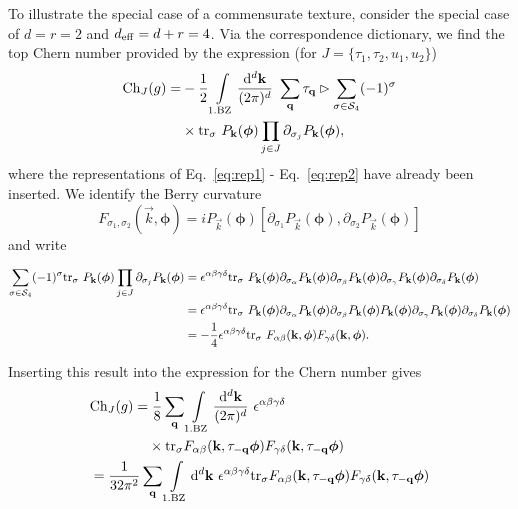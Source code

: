 \documentclass[
    10pt,
    aps,
    prb,
    twocolumn,
    floatfix,
    superscriptaddress,
]{revtex4-2}
\begin{document}
To illustrate the special case of a commensurate texture, consider the special case of $d=r=2$ and ${d_\mathrm{eff}} =d+r=4$.
Via the correspondence dictionary, we find the top Chern number provided by the expression (for $J=\lbrace \tau_1, \tau_2, u_1, u_2 \rbrace $)
\begin{align}
{\rm Ch}_{J}(g)
= & -\frac{1}{2}
\int\limits_{\mathrm{1.BZ}} \frac{\mathrm{d}^d \mathbf{k}}{(2\pi)^d}~\sum_{\mathbf{q}}\tau_{\mathbf{q}} \rhd\sum_{\sigma \in {\mathcal S}_{4}} (-1)^\sigma 
\notag \\ & 
\times \mathrm{tr}_\sigma ~ 
P_{\mathbf{k}}(\boldsymbol{\phi}) \prod_{j \in J} \partial_{\sigma_j}P_{\mathbf{k}}(\boldsymbol{\phi}),
\end{align}
where the representations of Eq.~\ref{eq:rep1} - Eq.~\ref{eq:rep2} have already been inserted.
We identify the Berry curvature 
\begin{equation}
	F_{\sigma_1, \sigma_2}(\vec{k}, \boldsymbol{\phi})
	= i P_{\vec{k}}(\boldsymbol{\phi}) [
	\partial_{\sigma_1} P_{\vec{k}}(\boldsymbol{\phi}), \partial_{\sigma_2} 
	P_{\vec{k}}(\boldsymbol{\phi}) ]
\end{equation}
and write
\begin{widetext}
\begin{align}
\sum_{\sigma \in {\mathcal S}_{4}} (-1)^\sigma \mathrm{tr}_\sigma ~ 
P_{\mathbf{k}}(\boldsymbol{\phi}) \prod_{j \in J} \partial_{\sigma_j}P_{\mathbf{k}}(\boldsymbol{\phi}) &=
\epsilon^{\alpha\beta\gamma\delta}
\mathrm{tr}_\sigma ~
P_{\mathbf{k}}(\boldsymbol{\phi}) \partial_{\sigma_\alpha }P_{\mathbf{k}}(\boldsymbol{\phi})
\partial_{\sigma_\beta }P_{\mathbf{k}}(\boldsymbol{\phi})
\partial_{\sigma_\gamma }P_{\mathbf{k}}(\boldsymbol{\phi})
\partial_{\sigma_\delta }P_{\mathbf{k}}(\boldsymbol{\phi})
\notag \\
&=
\epsilon^{\alpha\beta\gamma\delta}
\mathrm{tr}_\sigma ~
P_{\mathbf{k}}(\boldsymbol{\phi}) \partial_{\sigma_\alpha }P_{\mathbf{k}}(\boldsymbol{\phi})
\partial_{\sigma_\beta }P_{\mathbf{k}}(\boldsymbol{\phi})
P_{\mathbf{k}}(\boldsymbol{\phi}) 
\partial_{\sigma_\gamma }P_{\mathbf{k}}(\boldsymbol{\phi})
\partial_{\sigma_\delta }P_{\mathbf{k}}(\boldsymbol{\phi})
\notag \\
& = - \frac{1}{4}
\epsilon^{\alpha\beta\gamma\delta}
\mathrm{tr}_\sigma ~F_{\alpha \beta}(\mathbf{k}, \boldsymbol{\phi}) F_{\gamma\delta}(\mathbf{k}, \boldsymbol{\phi}) .
\end{align}
\end{widetext}   
\vfill
Inserting this result into the expression for the Chern number gives 
\begin{align}
	&{\rm Ch}_{J}(g) = \frac{1}{8 }\sum_{\vec{q}}
    \int\limits_{\mathrm{1.BZ}} \frac{\dd^d \vec{k}}{(2\pi)^d}~ \epsilon^{\alpha\beta\gamma\delta}
    \notag \\
    & \phantom{{\rm Ch}_{J}(g) = } \times
 \tr_\sigma F_{\alpha \beta}(\vec{k}, \tau_{-\vec{q}}\boldsymbol{\phi}) F_{\gamma\delta}(\vec{k}, \tau_{-\vec{q}}\boldsymbol{\phi}) 
 \notag \\
 & = \frac{1}{32 \pi^2}\sum_{\vec{q}}
 \int\limits_{\mathrm{1.BZ}}\dd^d \vec{k} ~ \epsilon^{\alpha\beta\gamma\delta}
 \tr_\sigma F_{\alpha \beta}(\vec{k}, \tau_{-\vec{q}}\boldsymbol{\phi}) F_{\gamma\delta}(\vec{k}, \tau_{-\vec{q}}\boldsymbol{\phi}) 
\end{align}
\end{document}
